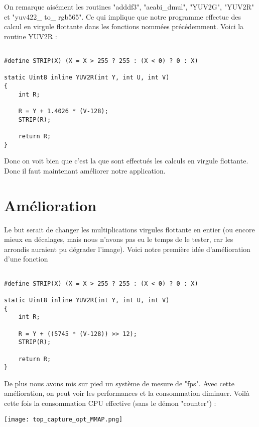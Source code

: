 On remarque aisément les routines "adddf3", "aeabi\_dmul", "YUV2G", "YUV2R" et "yuv422\_ to\_ rgb565". Ce qui implique que notre programme effectue des calcul en virgule flottante dans les fonctions nommées précédemment. Voici la routine YUV2R :

\begin{lstlisting}[frame=single,style=C]  % Start your code-block

#define STRIP(X) (X = X > 255 ? 255 : (X < 0) ? 0 : X)

static Uint8 inline YUV2R(int Y, int U, int V)
{
	int R;
	
	R = Y + 1.4026 * (V-128);
	STRIP(R);

	return R;
}
\end{lstlisting}

Donc on voit bien que c'est la que sont effectués les calculs en virgule flottante. Donc il faut maintenant améliorer notre application.

 

\pagebreak \section{Amélioration}

Le but serait de changer les multiplications virgules flottante en entier (ou encore mieux en décalages, mais nous n'avons pas eu le temps de le tester, car les arrondis auraient pu dégrader l'image). Voici notre première idée d'amélioration d'une fonction

\begin{lstlisting}[frame=single,style=C]  % Start your code-block

#define STRIP(X) (X = X > 255 ? 255 : (X < 0) ? 0 : X)

static Uint8 inline YUV2R(int Y, int U, int V)
{
	int R;
	
	R = Y + ((5745 * (V-128)) >> 12);
	STRIP(R);

	return R;
}
\end{lstlisting}

De plus nous avons mis sur pied un système de mesure de "fps". Avec cette amélioration, on peut voir les performances et la consommation diminuer. Voilà cette fois la consommation CPU effective (sans le démon "counter") :

\begin{center} 
\hspace{12.45cm}
\texttt{[image: top\_capture\_opt\_MMAP.png]}
\end{center}
\vspace{0.5cm}

